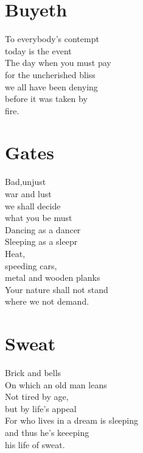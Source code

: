 \documentclass[a4paper,twoside, openany]{book}
\newenvironment{Verse}
  {\center\varwidth{\linewidth}\fontsize{18}{21.6}\selectfont}
  {\endvarwidth\endcenter}
\begin{document}
\chapter{Buyeth}
\begin{Verse}
   To everybody's contempt\\
   today is the event\\
   The day when you must pay\\
   for the uncherished bliss\\
   we all have been denying\\
   before it was taken by\\
   fire.
\end{Verse}

\chapter{Gates}
\begin{Verse}
   Bad,unjust\\
   war and lust\\
   we shall decide\\
   what you be must\\
   Dancing as a dancer\\
   Sleeping as a sleepr\\
   Heat,\\
   speeding cars,\\
   metal and wooden planks\\
   Your nature shall not stand\\
   where we not demand.
\end{Verse}

\chapter{Sweat}
\begin{Verse}
    Brick and bells\\
    On which an old man leans\\
    Not tired by age,\\
    but by life's appeal\\
    For who lives in a dream is sleeping\\
    and thus he's keeeping\\
    his life of sweat.
\end{Verse}
\end{document}
